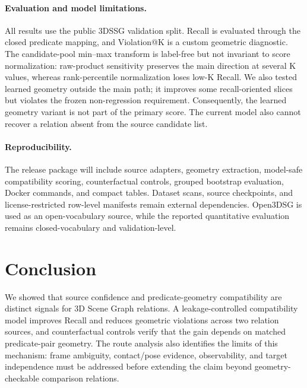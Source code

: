 \documentclass[letterpaper]{article} %
\begin{document}
\paragraph{Evaluation and model limitations.}
All results use the public 3DSSG validation split. Recall is evaluated through
the closed predicate mapping, and Violation@K is a custom geometric diagnostic.
The candidate-pool min--max transform is label-free but not invariant to score
normalization: raw-product sensitivity preserves the main direction at several
K values, whereas rank-percentile normalization loses low-K Recall. We also
tested learned geometry outside the main path; it improves some recall-oriented
slices but violates the frozen non-regression requirement. Consequently, the
learned geometry variant is not part of the primary score. The current model
also cannot recover a relation absent from the source candidate list.

\paragraph{Reproducibility.}
The release package will include source adapters, geometry extraction,
model-safe compatibility scoring, counterfactual controls, grouped bootstrap
evaluation, Docker commands, and compact tables. Dataset scans, source
checkpoints, and license-restricted row-level manifests remain external
dependencies. Open3DSG is used as an open-vocabulary source, while the reported
quantitative evaluation remains closed-vocabulary and validation-level.

\section{Conclusion}

We showed that source confidence and predicate-geometry compatibility are
distinct signals for 3D Scene Graph relations. A leakage-controlled
compatibility model improves Recall and reduces geometric violations across two
relation sources, and counterfactual controls verify that the gain depends on
matched predicate-pair geometry. The route analysis also identifies the limits
of this mechanism: frame ambiguity, contact/pose evidence, observability, and
target independence must be addressed before extending the claim beyond
geometry-checkable comparison relations.


\end{document}
